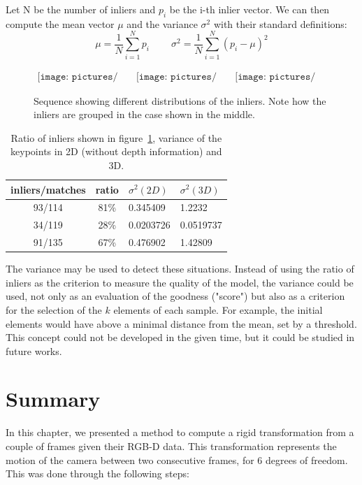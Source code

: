 Let N be the number of inliers and $p_i$ be the i-th inlier vector. We can then compute the mean vector $\mu$ and the variance $\sigma^2$ with their standard definitions:
\[
\mu = \frac{1}{N} \sum_{i=1}^N{p_i}
\;\;\;\;\;\;\;\;
\sigma^2 = \frac{1}{N} \sum_{i=1}^N{(p_i - \mu)^2}
\]

\begin{figure}[H]
\centering$
 \begin{array}{ccc}
 \texttt{[image: pictures/bad\_transform1]} &
 \texttt{[image: pictures/bad\_transform2]} &
 \texttt{[image: pictures/bad\_transform3]}
 \end{array}$
\caption{Sequence showing different distributions of the inliers. Note how the inliers are grouped in the case shown in the middle.}
\label{fig:bad_transform}
\end{figure}

\begin{table}[h]
\begin{center}
\begin{tabular}{ccll}
 inliers/matches & ratio & $\sigma^2(2D)$ & $\sigma^2(3D)$\\
 \hline
 93/114 &	81\% &	0.345409 &	1.2232\\
 34/119 &	28\% &	0.0203726 &	0.0519737\\
 91/135 &	67\% &	0.476902 &	1.42809\\
\end{tabular}
\end{center}
\caption{Ratio of inliers shown in figure~\ref{fig:bad_transform}, variance of the keypoints in 2D (without depth information) and 3D.}
\end{table}

The variance may be used to detect these situations. Instead of using the ratio of inliers as the criterion to measure the quality of the model, the variance could be used, not only as an evaluation of the goodness ("score") but also as a criterion for the selection of the $k$ elements of each sample. For example, the initial elements would have above a minimal distance from the mean, set by a threshold. This concept could not be developed in the given time, but it could be studied in future works. 

\section{Summary}

In this chapter, we presented a method to compute a rigid transformation from a couple of frames given their RGB-D data. This transformation represents the motion of the camera between two consecutive frames, for 6 degrees of freedom. This was done through the following steps:

